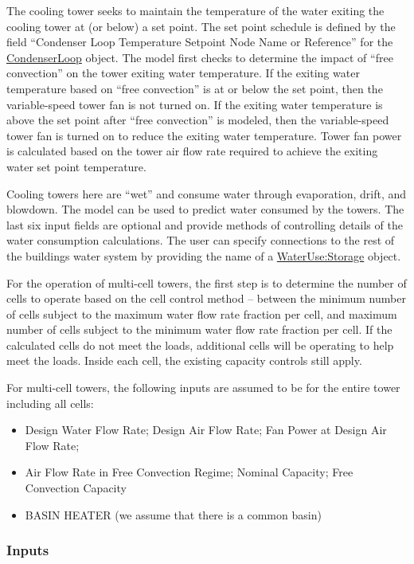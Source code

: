 The cooling tower seeks to maintain the temperature of the water exiting the cooling tower at (or below) a set point. The set point schedule is defined by the field ``Condenser Loop Temperature Setpoint Node Name or Reference'' for the \hyperref[condenserloop]{CondenserLoop} object. The model first checks to determine the impact of ``free convection'' on the tower exiting water temperature. If the exiting water temperature based on ``free convection'' is at or below the set point, then the variable-speed tower fan is not turned on. If the exiting water temperature is above the set point after ``free convection'' is modeled, then the variable-speed tower fan is turned on to reduce the exiting water temperature. Tower fan power is calculated based on the tower air flow rate required to achieve the exiting water set point temperature.

Cooling towers here are ``wet'' and consume water through evaporation, drift, and blowdown. The model can be used to predict water consumed by the towers. The last six input fields are optional and provide methods of controlling details of the water consumption calculations. The user can specify connections to the rest of the buildings water system by providing the name of a \hyperref[waterusestorage]{WaterUse:Storage} object.

For the operation of multi-cell towers, the first step is to determine the number of cells to operate based on the cell control method -- between the minimum number of cells subject to the maximum water flow rate fraction per cell, and maximum number of cells subject to the minimum water flow rate fraction per cell. If the calculated cells do not meet the loads, additional cells will be operating to help meet the loads. Inside each cell, the existing capacity controls still apply.

For multi-cell towers, the following inputs are assumed to be for the entire tower including all cells:

\begin{itemize}
\item
  Design Water Flow Rate; Design Air Flow Rate; Fan Power at Design Air Flow Rate;
\item
  Air Flow Rate in Free Convection Regime; Nominal Capacity; Free Convection Capacity
\item
  BASIN HEATER (we assume that there is a common basin)
\end{itemize}

\subsubsection{Inputs}\label{inputs-3-005}

